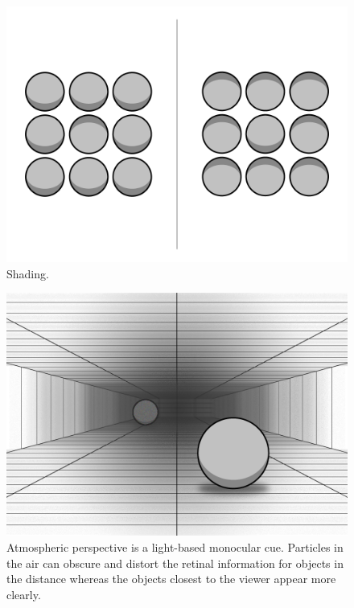 \begin{figure}[H]
	\centering
	\includegraphics[width=1\linewidth]{figure/Analysis/shading.png}
	\caption{Shading.}
	\label{fig:shading}
\end{figure}

\begin{figure}[H]
	\centering
	\includegraphics[width=1\linewidth]{figure/Analysis/atmosphericPerspective.png}
	\caption{Atmospheric perspective is a light-based monocular cue. Particles in the air can obscure and distort the retinal information for objects in the distance whereas the objects closest to the viewer appear more clearly.}
	\label{fig:atmosphericPerspective}
\end{figure}


